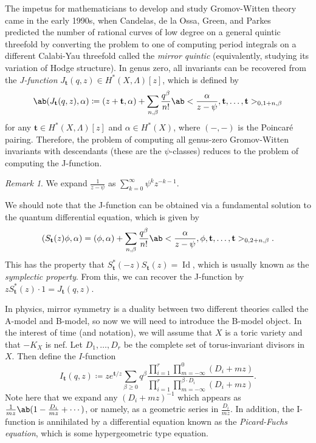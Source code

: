 \documentclass{amsart}
\theoremstyle{definition}
\theoremstyle{remark}
\newtheorem{rmk}[thm]{Remark}
\theoremstyle{plain}
\theoremstyle{definition}
\theoremstyle{remark}
\newcommand{\mbf}[1]{\mathbf{#1}}
\newcommand{\on}[1]{\operatorname{#1}}
\newcommand{\1}{\mathbf{1}}
\newcommand{\2}{\mathbf{2}}
\newcommand{\3}{\mathbf{3}}
\begin{document}
The impetus for mathematicians to develop and study Gromov-Witten theory came in the early 1990s, when Candelas, de la Ossa, Green, and Parkes~\cite{CandelasEtAl1991} predicted the number of rational curves of low degree on a general quintic threefold by converting the problem to one of computing period integrals on a different Calabi-Yau threefold called the \textit{mirror quintic} (equivalently, studying its variation of Hodge structure). In genus zero, all invariants can be recovered from the \textit{J-function} \(J_{\mbf{t}}(q,z) \in H^*(X, \Lambda)[z]\), which is defined by
\[ \ab( J_{\mbf{t}}(q, z), \alpha ) \coloneqq (z + \mbf{t}, \alpha) + \sum_{n, \beta} \frac{q^{\beta}}{n!} \ab< \frac{\alpha}{z-\psi}, \mbf{t}, \ldots, \mbf{t}>_{0,1+n, \beta} \]
for any \(\mbf{t} \in H^*(X, \Lambda)[z]\) and \(\alpha \in H^*(X)\), where \((-,-)\) is the Poincar\'e pairing. Therefore, the problem of computing all genus-zero Gromov-Witten invariants with descendants (these are the \(\psi\)-classes) reduces to the problem of computing the J-function.

\begin{rmk}
    We expand \(\frac{1}{z-\psi}\) as \(\sum_{k=0}^{\infty} \psi^k z^{-k-1}\).  
\end{rmk}

We should note that the J-function can be obtained via a fundamental solution to the quantum differential equation, which is given by
\[ ( S_{\mbf{t}}(z) \phi , \alpha) = (\phi, \alpha) + \sum_{n, \beta} \frac{q^{\beta}}{n!} \ab<\frac{\alpha}{z-\psi}, \phi, \mbf{t}, \ldots, \mbf{t}>_{0, 2+n, \beta}. \]
This has the property that \(S_{\mbf{t}}^*(-z) S_{\mbf{t}}(z) = \on{Id}\), which is usually known as the \textit{symplectic property}. From this, we can recover the J-function by \(z S_{\mbf{t}}^*(z)\cdot 1 = J_{\mbf{t}}(q, z)\).

In physics, mirror symmetry is a duality between two different theories called the A-model and B-model, so now we will need to introduce the B-model object. In the interest of time (and notation), we will assume that \(X\) is a toric variety and that \(-K_X\) is nef. Let \(D_1, \ldots, D_r\) be the complete set of torus-invariant divisors in \(X\). Then define the \(I\)-function
\[
    I_{\mbf{t}}(q, z) \coloneqq z e^{\mbf{t}/z} \sum_{\beta \geq 0} q^{\beta} \frac{\prod_{i=1}^r \prod_{m = -\infty}^{0} (D_i + mz)}{\prod_{i=1}^r \prod_{m=-\infty}^{\beta \cdot D_i} (D_i + mz)}.
\]
Note here that we expand any \((D_i + mz)^{-1}\) which appears as \(\frac{1}{mz} \ab(1 - \frac{D_i}{mz} + \cdots)\), or namely, as a geometric series in \(\frac{D_i}{mz}\). In addition, the I-function is annihilated by a differential equation known as the \textit{Picard-Fuchs equation}, which is some hypergeometric type equation.
\end{document}
